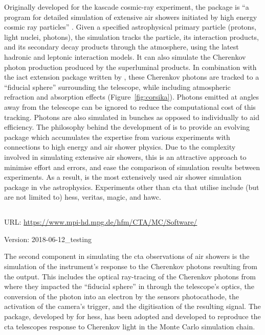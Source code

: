 \noindent Originally developed for the \gls{kascade} cosmic-ray experiment, the  package is ``a program for detailed simulation of extensive air showers initiated by high energy cosmic ray particles'' \cite[][p. i]{heck1998corsika}. Given a specified astrophysical primary particle (protons, light nuclei, photons), the simulation tracks the particle, its interaction products, and its secondary decay products through the atmosphere, using the latest hadronic and leptonic interaction models. It can also simulate the Cherenkov photon production produced by the superluminal products. In combination with the \gls{iact} extension package written by \textcite{Bernlohr2008}, these Cherenkov photons are tracked to a ``fiducial sphere'' surrounding the telescope, while including atmospheric refraction and absorption effects (Figure~\ref{fig:corsika}). Photons emitted at angles away from the telescope can be ignored to reduce the computational cost of this tracking. Photons are also simulated in bunches as opposed to individually to aid efficiency. The philosophy behind the development of  is to provide an evolving package which accumulates the expertise from various experiments with connections to high energy and air shower physics. Due to the complexity involved in simulating extensive air showers, this is an attractive approach to minimise effort and errors, and ease the comparison of simulation results between experiments. As a result,  is the most extensively used air shower simulation package in \gls{vhe} astrophysics. Experiments other than \gls{cta} that utilise  include (but are not limited to) \gls{hess}, \gls{veritas}, \gls{magic}, and \gls{hawc}.

\subsection{}
\vspace{-0.7em}
\noindent \hspace{\parindent} {\tiny URL: \url{https://www.mpi-hd.mpg.de/hfm/CTA/MC/Software/} \par}
\noindent \hspace{\parindent} {\tiny Version: 2018-06-12\_testing \par}

\noindent The second component in simulating the \gls{cta} observations of air showers is the simulation of the instrument's response to the Cherenkov photons resulting from the  output. This includes the optical ray-tracing of the Cherenkov photons from where they impacted the ``fiducial sphere'' in  through the telescope's optics, the conversion of the photon into an electron by the sensors photocathode, the activation of the camera's trigger, and the digitisation of the resulting signal. The  package, developed by \textcite{Bernlohr2008} for \gls{hess}, has been adopted and developed to reproduce the \gls{cta} telescopes response to Cherenkov light in the Monte Carlo simulation chain.

